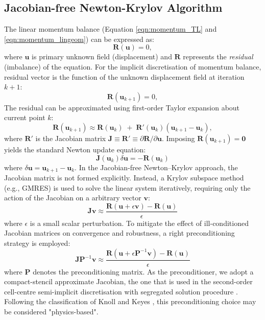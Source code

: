 \documentclass[sn-mathphys,Numbered]{sn-jnl}%
\newcommand{\bb}{\boldsymbol}
\begin{document}
\subsection{Jacobian-free Newton-Krylov Algorithm}
\label{sec:vol_int}
%
The linear momentum balance (Equation \eqref{eqn:momentum_TL} and \eqref{eqn:momentum_lingeom}) can be expressed as:
%
\begin{equation}
\bb{R}(\bb{u}) = 0,
\end{equation}
%
where $\bb{u}$ is primary unknown field (displacement) and $\bb{R}$ represents the \emph{residual} (imbalance) of the equation.
For the implicit discretisation of momentum balance, residual vector is the function of the unknown displacement field at iteration $k+1$:
%
\begin{equation}
\bb{R}(\bb{u}_{k+1}) = 0,
\end{equation}
%
The residual can be approximated using first-order Taylor expansion about current point $k$:
%
\begin{equation}
 	\bb{R}(\bb{u}_{k+1}) \approx \bb{R}(\bb{u}_{k}) \;+\;  \bb{R}'(\bb{u}_{k}) (\bb{u}_{k+1} - \bb{u}_{k}), 
\end{equation}
%
where $\bb{R}'$ is the Jacobian matrix $\bb{J}\equiv\bb{R}'\equiv\partial \bb{R} / \partial \bb{u}$. 
Imposing $\bb{R}(\bb{u}_{k+1}) = \bb{0}$ yields the standard Newton update equation:
%
\begin{equation}
\bb{J}(\bb{u}_k) \delta \bb{u} = -\bb{R}(\bb{u}_k)
\end{equation}
%
where $\delta \bb{u}=\bb{u}_{k+1} - \bb{u}_{k}$.
In the Jacobian-free Newton–Krylov approach, the Jacobian matrix is not formed explicitly.
Instead, a Krylov subspace method (e.g., GMRES) is used to solve the linear system iteratively, requiring only the action of the Jacobian on a arbitrary vector $\bb{v}$:
%
\begin{equation}
\bb{J} \bb{v} \approx \frac{\bb{R}(\bb{u}+\epsilon \bb{v})-\bb{R}(\bb{u})}{\epsilon}
\end{equation}
%
where $\epsilon$ is a small scalar perturbation.
To mitigate the effect of ill-conditioned Jacobian matrices on convergence and robustness, a right preconditioning strategy is employed:
%
\begin{equation}\label{eq:jfnk}
 	\bb{J} \bb{P}^{-1} \bb{v}\approx 	\frac{\bb{R}(\bb{u} + \epsilon \bb{P}^{-1} \bb{v}) - \bb{R}(\bb{u})}{\epsilon}
\end{equation}
%
where $\bb{P}$ denotes the preconditioning matrix.
As the preconditioner, we adopt a compact-stencil approximate Jacobian, the one that is used in the second-order cell-centre semi-implicit discretisation with segregated solution procedure \cite{Cardiff2018, Tukovic2018}. Following the classification of Knoll and Keyes \cite{Knoll2004}, this preconditioning choice may be considered "physics-based".
\end{document}
